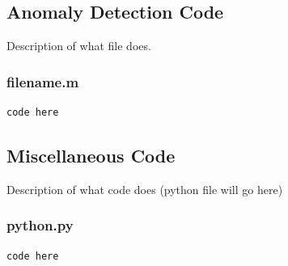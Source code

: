 \documentclass[12pt]{article}
\theoremstyle{plain}%
\theoremstyle{definition}
\theoremstyle{remark}
\begin{document}
\subsection{Anomaly Detection Code}
Description of what file does.
\subsubsection{filename.m}
\begin{verbatim}
code here
\end{verbatim}

\subsection{Miscellaneous Code}
Description of what code does (python file will go here)
\subsubsection{python.py}
\begin{verbatim}
code here
\end{verbatim}
\end{document}
